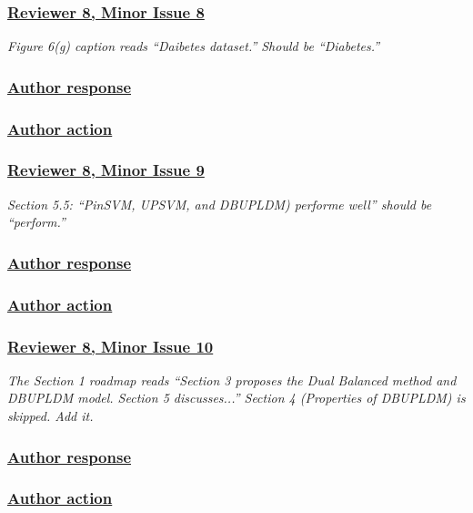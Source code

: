 \documentclass[journal,12pt, onecolumn]{IEEEtran}
\begin{document}
{\color{customgreen}
\subsubsection*{\underline{\textbf{Reviewer 8, Minor Issue 8}}}
\emph{Figure 6(g) caption reads ``Daibetes dataset.'' Should be ``Diabetes.''}
}


{\color{black}
\subsubsection*{\textbf{\underline{Author response}}}
}


{\color{black}
\subsubsection*{\textbf{\underline{Author action}}}
}


{\color{customgreen}
\subsubsection*{\underline{\textbf{Reviewer 8, Minor Issue 9}}}
\emph{Section 5.5: ``PinSVM, UPSVM, and DBUPLDM) performe well'' should be ``perform.''}
}


{\color{black}
\subsubsection*{\textbf{\underline{Author response}}}
}


{\color{black}
\subsubsection*{\textbf{\underline{Author action}}}
}


{\color{customgreen}
\subsubsection*{\underline{\textbf{Reviewer 8, Minor Issue 10}}}
\emph{The Section 1 roadmap reads ``Section 3 proposes the Dual Balanced method and DBUPLDM model. Section 5 discusses...'' Section 4 (Properties of DBUPLDM) is skipped. Add it.}
}


{\color{black}
\subsubsection*{\textbf{\underline{Author response}}}
}


{\color{black}
\subsubsection*{\textbf{\underline{Author action}}}
}
\end{document}

